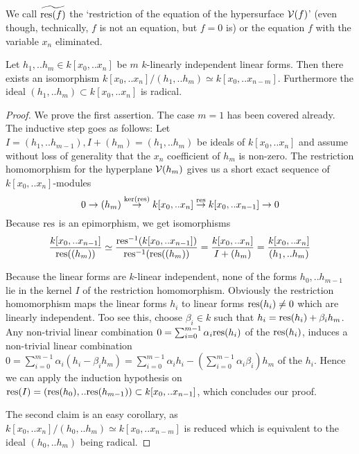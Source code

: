 \begin{definition}
We call $\widetilde{{\operatorname{res}}(f)}$ the `restriction of the equation of the hypersurface $\operatorname{\mathcal V}(f)$' (even though, technically, $f$ is not an equation, but $f=0$ is)
 or the equation $f$ with the variable $x_n$ eliminated.
\end{definition}


\begin{corollary} \label{corollaryRadical}
Let $h_1,.. h_m \in k[x_0,..x_n]$ be $m$ $k$-linearly independent linear forms.
Then there exists an isomorphism $k[x_0,..x_n]/(h_1,..h_m) \simeq k[x_0,..x_{n-m}]$.
Furthermore the ideal $(h_1,..h_m)\subset k[x_0,..x_n]$ is radical.
\end{corollary}
\begin{proof}
We prove the first assertion.
The case $m=1$ has been covered already.
The inductive step goes as follows:
Let $I = (h_1,..h_{m-1}), I+(h_m) = (h_1,..h_m)$ be ideals of $k[x_0,..x_n]$ and assume without loss of generality that the $x_n$ coefficient of $h_m$ is non-zero.
The restriction homomorphism for the hyperplane $\operatorname{\mathcal V}(h_m)$ gives us a short exact sequence of $k[x_0,..x_n]$-modules
\begin{equation}
0 \to (h_m) \overset{\ker({\operatorname{res}})}\to k[x_0,..x_n] \overset{{\operatorname{res}}}\to k[x_0,..x_{n-1}] \to 0
\end{equation}
Because ${\operatorname{res}}$ is an epimorphism, we get isomorphisms
\begin{equation}
\frac{k[x_0,..x_{n-1}]}{{\operatorname{res}}((h_m))}
\simeq \frac{{\operatorname{res}}^{-1}(k[x_0,..x_{n-1}])}{{\operatorname{res}}^{-1}({\operatorname{res}}((h_m))}
= \frac{k[x_0,..x_n]}{I+(h_m)}
= \frac{k[x_0,..x_n]}{(h_1,..h_m)}
\end{equation}

Because the linear forms are $k$-linear independent, none of the forms $h_0,..h_{m-1}$ lie in the kernel $I$ of the restriction homomorphism.
Obviously the restriction homomorphism maps the linear forms $h_i$ to linear forms ${\operatorname{res}}(h_i) \neq 0$ which are linearly independent.
Too see this, choose $\beta_i \in k$ such that $h_i = {\operatorname{res}}(h_i) + \beta_i h_m$.
Any non-trivial linear combination $0 = \sum_{i=0}^{m-1} \alpha_i {\operatorname{res}}(h_i)$ of the ${\operatorname{res}}(h_i)$, induces a non-trivial linear combination $0 = \sum_{i=0}^{m-1} \alpha_i(h_i - \beta_i h_m) = \sum_{i=0}^{m-1}\alpha_i h_i - (\sum_{i=0}^{m-1} \alpha_i\beta_i)h_m$ of the $h_i$.
Hence we can apply the induction hypothesis on ${\operatorname{res}}(I) = ({\operatorname{res}}(h_0),..{\operatorname{res}}(h_{m-1})) \subset k[x_0,..x_{n-1}]$, which concludes our proof.


The second claim is an easy corollary, as $k[x_0,..x_n]/(h_0,..h_m) \simeq k[x_0,..x_{n-m}]$ is reduced which is equivalent to the ideal $(h_0,..h_m)$ being radical.

\end{proof}

